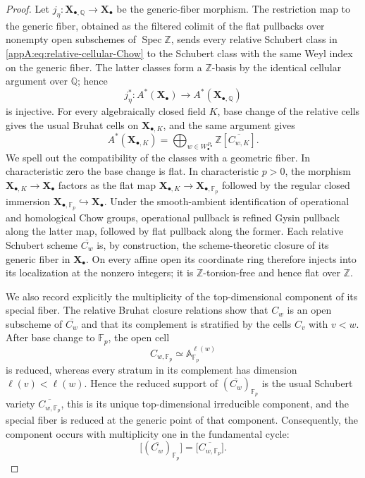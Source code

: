 \documentclass[11pt,a4paper,oneside]{amsart}
\numberwithin{equation}{section}
\theoremstyle{definition}
\theoremstyle{remark}
\begin{document}
\begin{proof}
Let $j_\eta:\mathbf X_{\bullet,\mathbb Q}\to\mathbf X_\bullet$ be the
generic-fiber morphism.  The restriction map to the generic fiber, obtained
as the filtered colimit of the flat pullbacks over nonempty open subschemes
of $\operatorname{Spec}\mathbb Z$, sends every relative Schubert class in
\eqref{appA:eq:relative-cellular-Chow} to the Schubert class with the same
Weyl index on the generic fiber.  The latter classes form a
$\mathbb Z$-basis by the identical cellular argument over $\mathbb Q$;
hence
\[
 j_\eta^*:A^*(\mathbf X_\bullet)
 \longrightarrow A^*(\mathbf X_{\bullet,\mathbb Q})
\]
is injective.  For every algebraically closed field $K$, base change of the
relative cells gives the usual Bruhat cells on $\mathbf X_{\bullet,K}$, and
the same argument gives
\[
 A^*(\mathbf X_{\bullet,K})
 =\bigoplus_{w\in W_\bullet^{P_\bullet}}\mathbb Z[\overline{C_{w,K}}].
\]
We spell out the compatibility of the classes with a geometric fiber.  In
characteristic zero the base change is flat.  In characteristic $p>0$, the
morphism $\mathbf X_{\bullet,K}\to\mathbf X_\bullet$ factors as the flat
map $\mathbf X_{\bullet,K}\to\mathbf X_{\bullet,\mathbb F_p}$ followed by
the regular closed immersion
$\mathbf X_{\bullet,\mathbb F_p}\hookrightarrow\mathbf X_\bullet$.
Under the smooth-ambient identification of operational and homological Chow
groups, operational pullback is refined Gysin pullback along the latter map,
followed by flat pullback along the former.  Each relative Schubert scheme
$\overline{C_w}$ is, by construction, the scheme-theoretic closure of its
generic fiber in $\mathbf X_\bullet$.  On every affine open its coordinate
ring therefore injects into its localization at the nonzero integers; it is
$\mathbb Z$-torsion-free and hence flat over $\mathbb Z$.

We also record explicitly the multiplicity of the top-dimensional component
of its special fiber.  The relative Bruhat closure relations show that
$C_w$ is an open subscheme of $\overline{C_w}$ and that its complement is
stratified by the cells $C_v$ with $v<w$.  After base change to
$\mathbb F_p$, the open cell
\[
  C_{w,\mathbb F_p}
  \simeq \mathbb A_{\mathbb F_p}^{\ell(w)}
\]
is reduced, whereas every stratum in its complement has dimension
$\ell(v)<\ell(w)$.  Hence the reduced support of
$(\overline{C_w})_{\mathbb F_p}$ is the usual Schubert variety
$\overline{C_{w,\mathbb F_p}}$, this is its unique top-dimensional
irreducible component, and the special fiber is reduced at the generic point
of that component.  Consequently, the component occurs with multiplicity
one in the fundamental cycle:
\[
  \bigl[(\overline{C_w})_{\mathbb F_p}\bigr]
  =
  \bigl[\overline{C_{w,\mathbb F_p}}\bigr].
\]


\end{proof}
\end{document}
